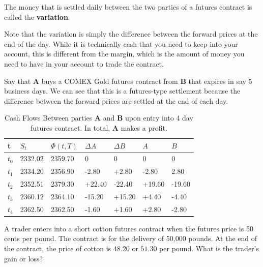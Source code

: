 \documentclass{article}
\begin{document}
      \begin{definition}[Variation]
        The money that is settled daily between the two parties of a futures contract is called the \textbf{variation}. 
      \end{definition}

      Note that the variation is simply the difference between the forward prices at the end of the day. While it is technically cash that you need to keep into your account, this is different from the margin, which is the amount of money you need to have in your account to trade the contract. 

      \begin{example}
        Say that \textbf{A} buys a COMEX Gold futures contract from \textbf{B} that expires in say 5 business days. We can see that this is a futures-type settlement because the difference between the forward prices are settled at the end of each day. 

        \begin{table}[H]
          \centering
          \begin{tabular}{|l|l|l|l|l|l|l|}
          \hline
          t & $S_t$ & $\Phi(t, T)$ & $\Delta A$ & $\Delta B$ & $A$ & $B$ \\ \hline 
          $t_0$ & 2332.02 & 2359.70 & 0 & 0 & 0 & 0 \\ \hline
          $t_1$ & 2334.20 & 2356.90 & -2.80 & +2.80 & -2.80 & 2.80 \\ \hline
          $t_2$ & 2352.51 & 2379.30 & +22.40 & -22.40 & +19.60 & -19.60 \\ \hline
          $t_3$ & 2360.12 & 2364.10 & -15.20 & +15.20 & +4.40 & -4.40 \\ \hline
          $t_4$ & 2362.50 & 2362.50 & -1.60 & +1.60 & +2.80 & -2.80 \\ \hline 
          \end{tabular}
          \caption{Cash Flows Between parties \textbf{A} and \textbf{B} upon entry into 4 day futures contract. In total, \textbf{A} makes a profit. }
          \label{tab:futures_gold_example}
        \end{table}
      \end{example}

      \begin{exercise}[Hull 1.6]
        A trader enters into a short cotton futures contract when the futures price is 50 cents per pound. The contract is for the delivery of 50,000 pounds. At the end of the contract, the price of cotton is $48.20$ or $51.30$ per pound. What is the trader's gain or loss?
      \end{exercise}
\end{document}
